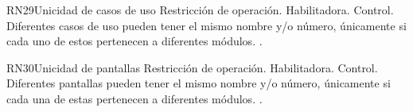 \begin{BussinesRule}{RN29}{Unicidad de casos de uso} 
	\BRitem[Tipo:] Restricción de operación. 
	\BRitem[Clase:] Habilitadora. 
	\BRitem[Nivel:] Control. %
	\BRitem[Descripción:] Diferentes casos de uso pueden tener el mismo nombre y/o número, únicamente si cada uno de estos pertenecen a diferentes módulos.
	 . 
\end{BussinesRule}

\begin{BussinesRule}{RN30}{Unicidad de pantallas} 
	\BRitem[Tipo:] Restricción de operación. 
	\BRitem[Clase:] Habilitadora. 
	\BRitem[Nivel:] Control. %
	\BRitem[Descripción:] Diferentes pantallas pueden tener el mismo nombre y/o número, únicamente si cada una de estas pertenecen a diferentes módulos.
	 \UCref{}{}. 
\end{BussinesRule}

